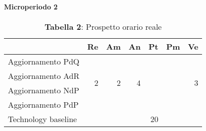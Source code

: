 \paragraph{Microperiodo 2}
\begin{table}[H]
	\centering
	\begin{tabular}{|l|r|r|r|l|l|r|}
		\hline
		\rowcolor{lighter-grayer}
		\multicolumn{1}{|c|}{\textbf{Attività}} & \multicolumn{1}{c|}{\textbf{Re}} & \multicolumn{1}{c|}{\textbf{Am}} & \multicolumn{1}{c|}{\textbf{An}} & \multicolumn{1}{c|}{\textbf{Pt}} & \multicolumn{1}{c|}{\textbf{Pm}} & \multicolumn{1}{c|}{\textbf{Ve}} \\ \hline
		Aggiornamento PdQ                       & \multirow{4}{*}{2}               & \multirow{4}{*}{2}               & \multirow{4}{*}{4}               &                                  &                                  & \multirow{4}{*}{3}               \\ \cline{1-1} \cline{5-6}
		Aggiornamento AdR                       &                                  &                                  &                                  &                                  &                                  &                                  \\ \cline{1-1} \cline{5-6}
		Aggiornamento NdP                       &                                  &                                  &                                  &                                  &                                  &                                  \\ \cline{1-1} \cline{5-6}
		Aggiornamento PdP                       &                                  &                                  &                                  &                                  &                                  &                                  \\ \hline
		Technology baseline                     & \multicolumn{1}{l|}{}            & \multicolumn{1}{l|}{}            & \multicolumn{1}{l|}{}            & \multicolumn{1}{r|}{20}          &                                  & \multicolumn{1}{l|}{}            \\ \hline
	\end{tabular}
\caption*{\textbf{Tabella 2}: Prospetto orario reale\\}
\end{table}

